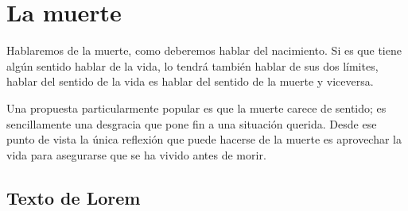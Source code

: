 \chapter{La muerte}

Hablaremos de la muerte, como deberemos hablar del nacimiento. Si es que tiene algún sentido hablar de la vida, lo tendrá también hablar de sus dos límites, hablar del sentido de la vida es hablar del sentido de la muerte y viceversa.

Una propuesta particularmente popular es que la muerte carece de sentido; es sencillamente una desgracia que pone fin a una situación querida. Desde ese punto de vista la única reflexión que puede hacerse de la muerte es aprovechar la vida para asegurarse que se ha vivido antes de morir.

\section{Texto de Lorem}

\lipsum